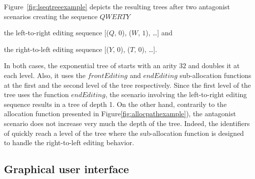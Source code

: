 \begin{figure*}
  \centering
  \subfloat {}
  \hspace{10pt}
  \subfloat {}
  \caption{\label{fig:lseqtreeexample}\LSEQ tree handling two monotonic
    editing behaviors.}
\end{figure*}


Figure~\ref{fig:lseqtreeexample} depicts the resulting trees after two
antagonist scenarios creating the sequence $QWERTY$
\begin{inparaenum}[(i)] 
\item the left-to-right editing sequence [($Q,\,0$), ($W,\,1$), \ldots] and
\item the right-to-left editing sequence [($Y,\,0$), ($T,\,0$), \ldots].
\end{inparaenum}
In both cases, the exponential tree of \LSEQ starts with an arity $32$ and
doubles it at each level. Also, it uses the $frontEditing$ and $endEditing$
sub-allocation functions at the first and the second level of the tree
respectively. Since the first level of the tree uses the function $endEditing$,
the scenario involving the left-to-right editing sequence results in a tree of
depth 1. On the other hand, contrarily to the allocation function presented in
Figure\ref{fig:allocpathexample}), the antagonist scenario does not increase
very much the depth of the tree. Indeed, the identifiers of \LSEQ quickly reach
a level of the tree where the sub-allocation function is designed to handle the
right-to-left editing behavior.

\subsection{Graphical user interface}

\begin{table}
  \centering
  
  \caption{\label{table:lseqlookup}
    Upper-bound on time complexity of the look-up on a \LSEQ structure.
    Where $I$ is the document size.}
\end{table}



